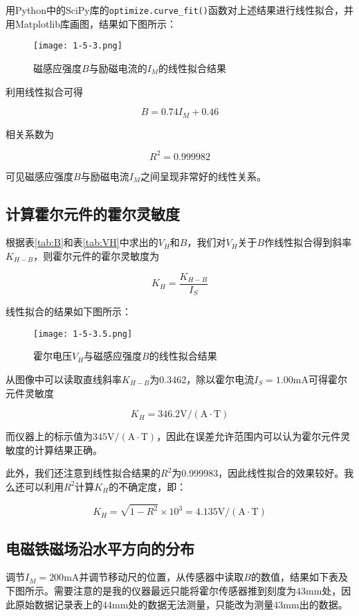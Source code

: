 \documentclass[12pt]{article}
\begin{document}
用Python中的SciPy库的\verb|optimize.curve_fit()|函数对上述结果进行线性拟合，并用Matplotlib库画图，结果如下图所示：

\begin{figure}[htbp]
    \centering
    \texttt{[image: 1-5-3.png]}
    \caption{磁感应强度$B$与励磁电流的$I_M$的线性拟合结果}
\end{figure}

利用线性拟合可得

\[
    B=0.74I_M+0.46
\]

相关系数为

\[
    R^2=0.999982
\]

可见磁感应强度$B$与励磁电流$I_M$之间呈现非常好的线性关系。

\subsection{计算霍尔元件的霍尔灵敏度}
根据表\ref{tab:B}和表\ref{tab:VH}中求出的$V_H$和$B$，我们对$V_H$关于$B$作线性拟合得到斜率$K_{H-B}$，则霍尔元件的霍尔灵敏度为

\[
    K_H=\frac{K_{H-B}}{I_S}
\]

线性拟合的结果如下图所示：

\begin{figure}[htbp]
    \centering
    \texttt{[image: 1-5-3.5.png]}
    \caption{霍尔电压$V_H$与磁感应强度$B$的线性拟合结果}
\end{figure}

从图像中可以读取直线斜率$K_{H-B}$为0.3462，除以霍尔电流$I_S=1.00\mathrm{mA}$可得霍尔元件灵敏度

\[
    K_H=346.2\mathrm{V/(A\cdot T)}
\]

而仪器上的标示值为$345\mathrm{V/(A\cdot T)}$，因此在误差允许范围内可以认为霍尔元件灵敏度的计算结果正确。

此外，我们还注意到线性拟合结果的$R^2$为0.999983，因此线性拟合的效果较好。我么还可以利用$R^2$计算$K_H$的不确定度，即：

\[
    K_H=\sqrt{1-R^2}\times10^3=4.135\mathrm{V/(A\cdot T)}
\]

\subsection{电磁铁磁场沿水平方向的分布}
调节$I_M=200\mathrm{mA}$并调节移动尺的位置，从传感器中读取$B$的数值，结果如下表及下图所示。需要注意的是我的仪器最远只能将霍尔传感器推到刻度为43mm处，因此原始数据记录表上的44mm处的数据无法测量，只能改为测量43mm出的数据。
\end{document}
